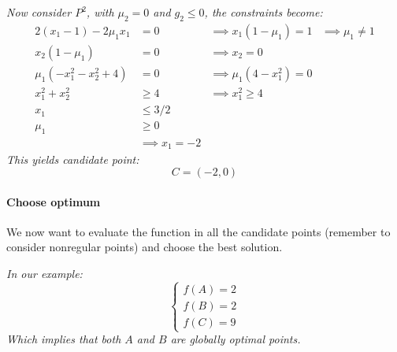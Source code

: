 \textit{Now consider $P^2$, with $\mu_2 = 0$ and $g_2 \leq 0$, the constraints become:
\begin{align*}
	2(x_1 - 1) - 2 \mu_1 x_1 & = 0 & \implies x_1 (1 - \mu_1) = 1 & \implies \mu_1 \neq 1 \\
	x_2 (1 - \mu_1) & = 0 & \implies x_2 = 0 \\
	\mu_1(-x_1^2 -x_2^2 + 4) & = 0 & \implies \mu_1 (4 - x_1^2) = 0 \\
	x_1^2 + x_2^2 & \geq 4 & \implies x_1^2 \geq 4 \\
	x_1 & \leq 3/2 \\
	\mu_1 & \geq 0 \\
	& \implies x_1 = -2
\end{align*}
This yields candidate point:
$$ C = \left(-2, 0\right)$$}

\paragraph{Choose optimum} We now want to evaluate the function in all the candidate points (remember to consider nonregular points) and choose the best solution.

\textit{In our example:
$$
\begin{cases}
	f(A) = 2 \\
	f(B) = 2 \\
	f(C) = 9
\end{cases}
$$
Which implies that both $A$ and $B$ are globally optimal points.}


